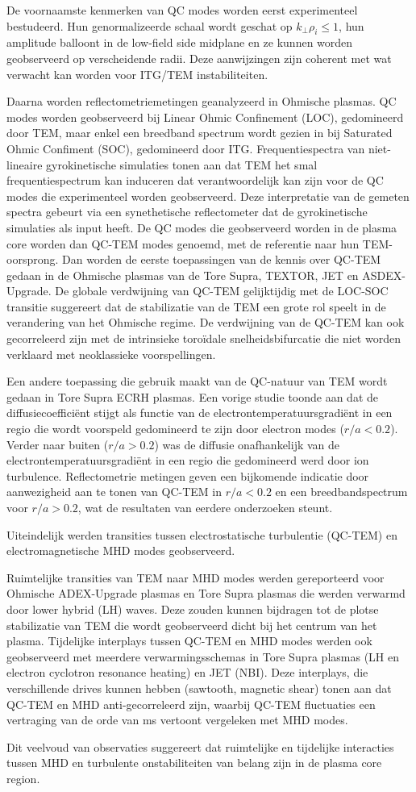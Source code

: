 De voornaamste kenmerken van QC modes worden eerst experimenteel bestudeerd. Hun genormalizeerde schaal wordt geschat op $k_{\perp}\rho_i\leq1$, hun amplitude balloont in de low-field side midplane en ze kunnen worden geobserveerd op verscheidende radii. Deze aanwijzingen zijn coherent met wat verwacht kan worden voor ITG/TEM instabiliteiten.

Daarna worden reflectometriemetingen geanalyzeerd in Ohmische plasmas. QC modes worden geobserveerd bij Linear Ohmic Confinement (LOC), gedomineerd door TEM, maar enkel een breedband spectrum wordt gezien in bij Saturated Ohmic Confiment (SOC), gedomineerd door ITG. Frequentiespectra van niet-lineaire gyrokinetische simulaties tonen aan dat TEM het smal frequentiespectrum kan induceren dat verantwoordelijk kan zijn voor de QC modes die experimenteel worden geobserveerd. Deze interpretatie van de gemeten spectra gebeurt via een synethetische reflectometer dat de gyrokinetische simulaties als input heeft. De QC modes die geobserveerd worden in de plasma core worden dan QC-TEM modes genoemd, met de referentie naar hun TEM-oorsprong. Dan worden de eerste toepassingen van de kennis over QC-TEM gedaan in de Ohmische plasmas van de Tore Supra, TEXTOR, JET en ASDEX-Upgrade. De globale verdwijning van QC-TEM gelijktijdig met de LOC-SOC transitie suggereert dat de stabilizatie van de TEM een grote rol speelt in de verandering van het Ohmische regime. De verdwijning van de QC-TEM kan ook gecorreleerd zijn met de intrinsieke toroïdale snelheidsbifurcatie die niet worden verklaard met neoklassieke voorspellingen.

Een andere toepassing die gebruik maakt van de QC-natuur van TEM wordt gedaan in Tore Supra ECRH plasmas. Een vorige studie toonde aan dat de diffusiecoefficiënt stijgt als functie van de electrontemperatuursgradiënt in een regio die wordt voorspeld gedomineerd te zijn door electron modes ($r/a<0.2$). Verder naar buiten ($r/a>0.2$) was de diffusie onafhankelijk van de  electrontemperatuursgradiënt in een regio die gedomineerd werd door ion turbulence. Reflectometrie metingen geven een bijkomende indicatie door aanwezigheid aan te tonen van QC-TEM in $r/a<0.2$ en een breedbandspectrum voor $r/a>0.2$, wat de resultaten van eerdere onderzoeken steunt.

Uiteindelijk werden transities tussen electrostatische turbulentie (QC-TEM) en electromagnetische MHD modes geobserveerd.

Ruimtelijke transities van TEM naar MHD modes werden gereporteerd voor Ohmische ADEX-Upgrade plasmas en Tore Supra plasmas die werden verwarmd door lower hybrid (LH) waves. Deze zouden kunnen bijdragen tot de plotse stabilizatie van TEM die wordt geobserveerd dicht bij het centrum van het plasma. Tijdelijke interplays tussen QC-TEM en MHD modes werden ook geobserveerd met meerdere verwarmingsschemas in Tore Supra plasmas (LH en electron cyclotron resonance heating) en JET (NBI). Deze interplays, die verschillende drives kunnen hebben (sawtooth, magnetic shear) tonen aan dat QC-TEM en MHD anti-gecorreleerd zijn, waarbij QC-TEM fluctuaties een vertraging van de orde van ms vertoont vergeleken met MHD modes.

Dit veelvoud van observaties suggereert dat ruimtelijke en tijdelijke interacties tussen MHD en turbulente onstabiliteiten van belang zijn in de plasma core region.
